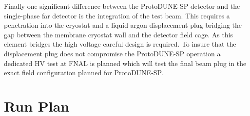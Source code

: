 Finally one significant difference between the ProtoDUNE-SP detector and the single-phase far detector is the integration of the test beam. This requires a penetration into the cryostat and a liquid argon displacement plug bridging the gap between the membrane cryostat wall and the detector field cage. As this element bridges the high voltage careful design is required. To insure that the displacement plug does not compromise the ProtoDUNE-SP operation a dedicated HV test at FNAL is planned which will test the final beam plug in the exact field configuration planned for ProtoDUNE-SP.

\section{Run Plan}
\label{sec:runplan}

